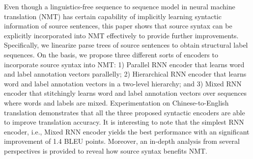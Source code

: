 Even though a linguistics-free sequence to sequence model in neural machine translation (NMT) has certain capability of implicitly learning syntactic information of source sentences, this paper shows that source syntax can be explicitly incorporated into NMT effectively to provide further improvements. Specifically, we linearize parse trees of source sentences to obtain structural label sequences. On the basis, we propose three different sorts of encoders to incorporate source syntax into NMT: 1) Parallel RNN encoder that learns word and label annotation vectors parallelly; 2) Hierarchical RNN encoder that learns word and label annotation vectors in a two-level hierarchy; and 3) Mixed RNN encoder that stitchingly learns word and label annotation vectors over sequences where words and labels are mixed. Experimentation on Chinese-to-English translation demonstrates that all the three proposed syntactic encoders are able to improve translation accuracy. It is interesting to note that the simplest RNN encoder, i.e., Mixed RNN encoder yields the best performance with an significant improvement of 1.4 BLEU points. Moreover, an in-depth analysis from several perspectives is provided to reveal how source syntax benefits NMT.
